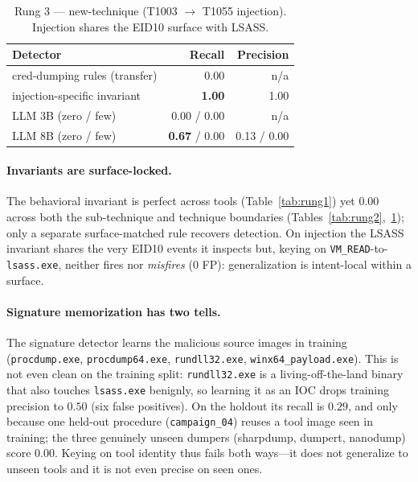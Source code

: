 \documentclass[sigconf,nonacm]{acmart}
\begin{document}
\begin{table}[t]
\caption{Rung 3 --- new-technique (T1003 $\rightarrow$ T1055 injection).
Injection shares the EID10 surface with LSASS.}
\label{tab:rung3}
\small
\begin{tabular}{@{}lrr@{}}
\toprule
Detector & Recall & Precision \\
\midrule
cred-dumping rules (transfer)    & 0.00 & n/a \\
injection-specific invariant     & \textbf{1.00} & 1.00 \\
LLM 3B (zero / few)              & 0.00 / 0.00 & n/a \\
LLM 8B (zero / few)              & \textbf{0.67} / 0.00 & 0.13 / 0.00 \\
\bottomrule
\end{tabular}
\end{table}

\paragraph{Invariants are surface-locked.}
The behavioral invariant is perfect across tools (Table~\ref{tab:rung1}) yet
$0.00$ across both the sub-technique and technique boundaries
(Tables~\ref{tab:rung2},~\ref{tab:rung3}); only a separate surface-matched rule
recovers detection. On injection the LSASS invariant shares the very EID10
events it inspects but, keying on \texttt{VM\_READ}-to-\texttt{lsass.exe},
neither fires nor \emph{misfires} ($0$ FP): generalization is intent-local
within a surface.

\paragraph{Signature memorization has two tells.}
The signature detector learns the malicious source images in training
(\texttt{procdump.exe}, \texttt{procdump64.exe}, \texttt{rundll32.exe},
\texttt{winx64\_payload.exe}). This is not even clean on the training split:
\texttt{rundll32.exe} is a living-off-the-land binary that also touches
\texttt{lsass.exe} benignly, so learning it as an IOC drops training precision to
$0.50$ (six false positives). On the holdout its recall is $0.29$, and only
because one held-out procedure (\texttt{campaign\_04}) reuses a tool image seen
in training; the three genuinely unseen dumpers (sharpdump, dumpert, nanodump)
score $0.00$. Keying on tool identity thus fails both ways---it does not
generalize to unseen tools and it is not even precise on seen ones.
\end{document}
